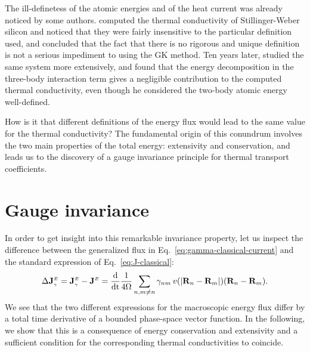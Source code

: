 \begin{LEtext}
The ill-definetess of the atomic energies and of the heat current was already noticed by some authors. \citet{Schelling2002} computed the thermal conductivity of Stillinger-Weber \cite{Stillinger1985} silicon and noticed that they were fairly insensitive to the particular definition used, and concluded that the fact that there is no rigorous and unique definition is not a serious impediment to using the GK method. Ten years later, \citet{Howell2012} studied the same system more extensively, and found that the energy decomposition in the three-body interaction term gives a negligible contribution to the computed thermal conductivity, even though he considered the two-body atomic energy well-defined.

How is it that different definitions of the energy flux would lead to the same value for the thermal conductivity? The fundamental origin of this conundrum involves the two main properties of the total energy: extensivity and conservation, and leads us to the discovery of a gauge invariance principle for thermal transport coefficients.
\end{LEtext}


\section{Gauge invariance}

In order to get insight into this remarkable invariance property, let us inspect the difference between the generalized flux in Eq.~\eqref{eq:gamma-classical-current} and the standard expression of Eq.~\eqref{eq:J-classical}:
\begin{equation}
  \rDelta\mathbf{J}^\smallE_{\smallgamma} =\mathbf{J}^\smallE_{\smallgamma}-\mathbf{J}^\smallE  =\frac{\mathrm{d}}{\mathrm{dt}}\frac{1}{4 \rOmega} \sum_{n,m\ne n}  \gamma_{nm} \, v(|\mathbf{R}_{n}-\mathbf{R}_{m}|)  (\mathbf{R}_{n}-\mathbf{R}_{m}). \label{eq:DeltaJ}
\end{equation}
We see that the two different expressions for the macroscopic energy flux differ by a total time derivative of a bounded phase-space vector function. In the following, we show that this is a consequence of energy conservation and extensivity and a sufficient condition for the corresponding thermal conductivities to coincide.

